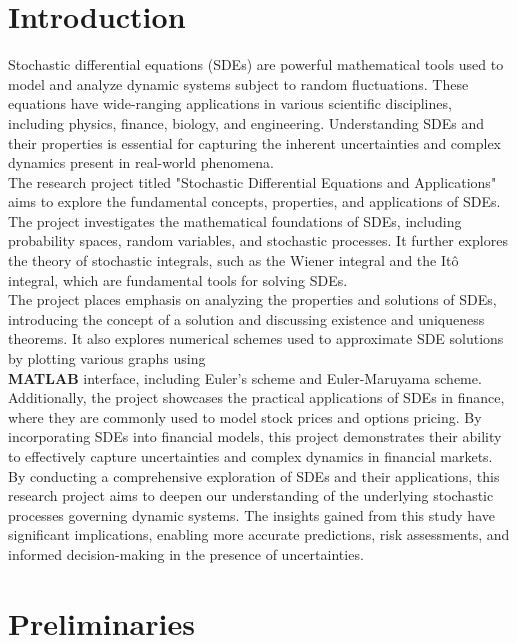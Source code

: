 \documentclass[twoside,final]{hcmut-report}
\begin{document}
\section{Introduction}

Stochastic differential equations (SDEs) are powerful mathematical tools used to model and analyze dynamic systems subject to random fluctuations. These equations have wide-ranging applications in various scientific disciplines, including physics, finance, biology, and engineering. Understanding SDEs and their properties is essential for capturing the inherent uncertainties and complex dynamics present in real-world phenomena.\\

The research project titled "Stochastic Differential Equations and Applications" aims to explore the fundamental concepts, properties, and applications of SDEs. The project investigates the mathematical foundations of SDEs, including probability spaces, random variables, and stochastic processes. It further explores the theory of stochastic integrals, such as the Wiener integral and the Itô integral, which are fundamental tools for solving SDEs.\\

The project places emphasis on analyzing the properties and solutions of SDEs, introducing the concept of a solution and discussing existence and uniqueness theorems. It also explores numerical schemes used to approximate SDE solutions by plotting various graphs using\\ \textbf{MATLAB} interface, including Euler's scheme and Euler-Maruyama scheme.\\

Additionally, the project showcases the practical applications of SDEs in finance, where they are commonly used to model stock prices and options pricing. By incorporating SDEs into financial models, this project demonstrates their ability to effectively capture uncertainties and complex dynamics in financial markets.\\

By conducting a comprehensive exploration of SDEs and their applications, this research project aims to deepen our understanding of the underlying stochastic processes governing dynamic systems. The insights gained from this study have significant implications, enabling more accurate predictions, risk assessments, and informed decision-making in the presence of uncertainties.


\pagebreak
\section{Preliminaries}
\end{document}

